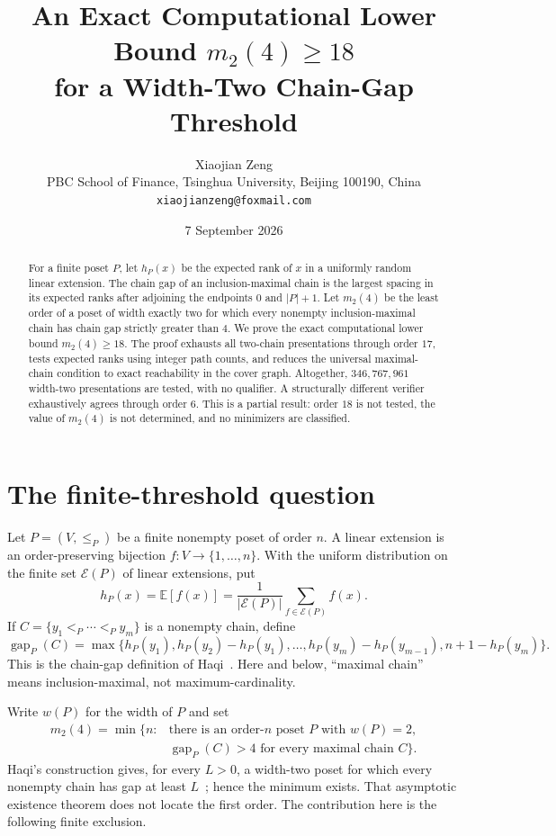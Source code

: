 \documentclass[11pt]{article}
\title{An Exact Computational Lower Bound $m_2(4)\geq 18$\\
for a Width-Two Chain-Gap Threshold}
\author{Xiaojian Zeng\\
\small PBC School of Finance, Tsinghua University, Beijing 100190, China\\
\small \texttt{xiaojianzeng@foxmail.com}}
\date{7 September 2026}
\theoremstyle{definition}
\newcommand{\E}{\mathbb{E}}
\newcommand{\cE}{\mathcal{E}}
\newcommand{\gap}{\operatorname{gap}}
\begin{document}
\maketitle

\begin{abstract}
For a finite poset $P$, let $h_P(x)$ be the expected rank of $x$ in a
uniformly random linear extension.  The chain gap of an inclusion-maximal
chain is the largest spacing in its expected ranks after adjoining the
endpoints $0$ and $|P|+1$.  Let $m_2(4)$ be the least order of a poset of
width exactly two for which every nonempty inclusion-maximal chain has chain
gap strictly greater than $4$.  We prove the exact computational lower bound
$m_2(4)\geq18$.  The proof exhausts all two-chain presentations through order
$17$, tests expected ranks using integer path counts, and reduces the
universal maximal-chain condition to exact reachability in the cover graph.
Altogether, $346{,}767{,}961$ width-two presentations are tested, with no
qualifier.  A structurally different verifier exhaustively agrees through
order $6$.  This is a partial result: order $18$ is not tested, the value of
$m_2(4)$ is not determined, and no minimizers are classified.
\end{abstract}

\section{The finite-threshold question}

Let $P=(V,\leq_P)$ be a finite nonempty poset of order $n$.  A linear
extension is an order-preserving bijection $f:V\to\{1,\ldots,n\}$.  With the
uniform distribution on the finite set $\cE(P)$ of linear extensions, put
\[
  h_P(x)=\E[f(x)]
  =\frac{1}{|\cE(P)|}\sum_{f\in\cE(P)}f(x).
\]
If $C=\{y_1<_P\cdots<_P y_m\}$ is a nonempty chain, define
\[
 \gap_P(C)=\max\{h_P(y_1),h_P(y_2)-h_P(y_1),\ldots,
 h_P(y_m)-h_P(y_{m-1}),n+1-h_P(y_m)\}.
\]
This is the chain-gap definition of Haqi~\cite{haqi2026gap}.  Here and below,
``maximal chain'' means inclusion-maximal, not maximum-cardinality.

Write $w(P)$ for the width of $P$ and set
\begin{align*}
 m_2(4)=\min\bigl\{n:{}&\text{there is an order-$n$ poset $P$ with }w(P)=2,\\
 &\gap_P(C)>4\text{ for every maximal chain }C\bigr\}.
\end{align*}
Haqi's construction gives, for every $L>0$, a width-two poset for which every
nonempty chain has gap at least $L$~\cite[Theorem~5.1]{haqi2026gap}; hence the
minimum exists.  That asymptotic existence theorem does not locate the first
order.  The contribution here is the following finite exclusion.
\end{document}
